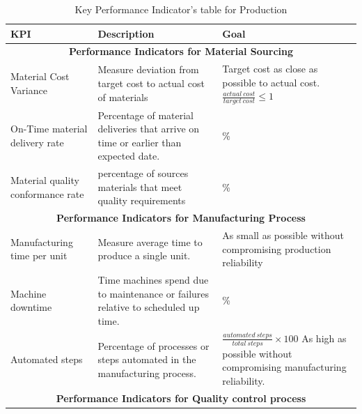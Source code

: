 \documentclass{article}
\begin{document}
  \begin{table}[H]
    \caption{Key Performance Indicator's table for Production}
    \Large
    \begin{tabular}{ |p{3cm}|p{10.5cm}|p{4cm}| } \hline
      \textbf{KPI} & \textbf{Description} & \textbf{Goal} \\ \hline

      \multicolumn{3}{|c|}{\textbf{Performance Indicators for Material Sourcing}} \\ \hline

      Material Cost Variance &
      Measure deviation from target cost to actual cost of materials &
      Target cost as close as possible to actual cost.
      \begin{math} \frac{actual \ cost}{target \ cost} \le 1 \end{math} \\
      \hline
      On-Time material delivery rate &
      Percentage of material deliveries that arrive on time or earlier than expected
      date. &
      \ge 90\% \\
      \hline
      Material quality conformance rate &
      percentage of sources materials that meet quality requirements &
      \ge 95\% \\
      \hline

      \multicolumn{3}{|c|}{\textbf{Performance Indicators for Manufacturing
      Process}} \\ \hline

      Manufacturing time per unit &
      Measure average time to produce a single unit. &
      As small as possible without compromising production reliability \\
      \hline
      Machine downtime &
      Time machines spend due to maintenance or failures relative to scheduled
      up time. &
      \le 5\% \\
      \hline
      Automated steps &
      Percentage of processes or steps automated in the manufacturing process. &
      \begin{math} \frac{automated \ steps}{total \ steps} \times 100 \end{math}
        As high as possible without compromising manufacturing reliability. \\
      \hline

      \multicolumn{3}{|c|}{\textbf{Performance Indicators for Quality control
      process}} \\ \hline


\end{tabular}
\end{table}
\end{document}
